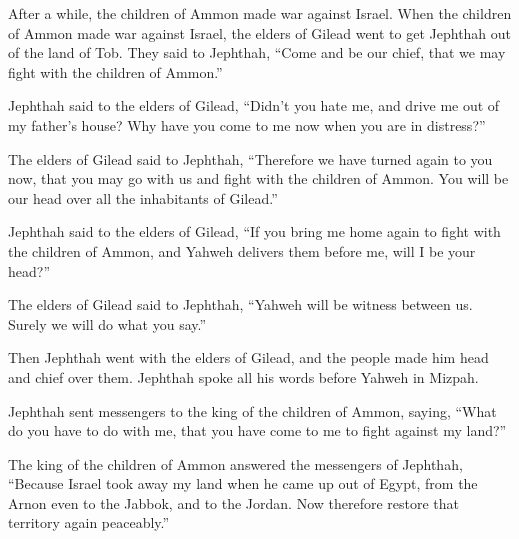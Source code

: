  After a while, the children of Ammon made war against
Israel.  When the children of Ammon made war against Israel,
the elders of Gilead went to get Jephthah out of the land of Tob.
 They said to Jephthah, ``Come and be our chief, that we may
fight with the children of Ammon.''

 Jephthah said to the elders of Gilead, ``Didn't you hate
me, and drive me out of my father's house? Why have you come to me now
when you are in distress?''

 The elders of Gilead said to Jephthah, ``Therefore we have
turned again to you now, that you may go with us and fight with the
children of Ammon. You will be our head over all the inhabitants of
Gilead.''

 Jephthah said to the elders of Gilead, ``If you bring me
home again to fight with the children of Ammon, and Yahweh delivers them
before me, will I be your head?''

 The elders of Gilead said to Jephthah, ``Yahweh will be
witness between us. Surely we will do what you say.''

 Then Jephthah went with the elders of Gilead, and the
people made him head and chief over them. Jephthah spoke all his words
before Yahweh in Mizpah.

 Jephthah sent messengers to the king of the children of
Ammon, saying, ``What do you have to do with me, that you have come to
me to fight against my land?''

 The king of the children of Ammon answered the messengers
of Jephthah, ``Because Israel took away my land when he came up out of
Egypt, from the Arnon even to the Jabbok, and to the Jordan. Now
therefore restore that territory again peaceably.''

